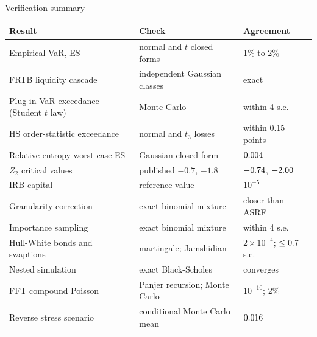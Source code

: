 \begin{frame}{Verification summary}
  \footnotesize
  \begin{tabular}{L{0.4\textwidth}L{0.3\textwidth}L{0.2\textwidth}}
    \toprule
    Result & Check & Agreement \\
    \midrule
    Empirical VaR, ES & normal and $t$ closed forms & 1\% to 2\% \\
    FRTB liquidity cascade & independent Gaussian classes & exact \\
    Plug-in VaR exceedance (Student $t$ law) & Monte Carlo & within 4 s.e. \\
    HS order-statistic exceedance & normal and $t_3$ losses & within 0.15 points \\
    Relative-entropy worst-case ES & Gaussian closed form & $0.004$ \\
    $Z_2$ critical values & published $-0.7$, $-1.8$ & $-0.74$, $-2.00$ \\
    IRB capital & reference value & $10^{-5}$ \\
    Granularity correction & exact binomial mixture & closer than ASRF \\
    Importance sampling & exact binomial mixture & within 4 s.e. \\
    Hull-White bonds and swaptions & martingale; Jamshidian & $2\times10^{-4}$; $\le0.7$ s.e. \\
    Nested simulation & exact Black-Scholes & converges \\
    FFT compound Poisson & Panjer recursion; Monte Carlo & $10^{-10}$; 2\% \\
    Reverse stress scenario & conditional Monte Carlo mean & $0.016$ \\
    \bottomrule
  \end{tabular}
\end{frame}
